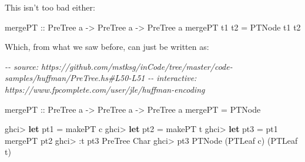 \documentclass[]{article}
\newenvironment{Shaded}{}{}
\newcommand{\CharTok}[1]{\textcolor[rgb]{0.25,0.44,0.63}{#1}}
\newcommand{\CommentTok}[1]{\textcolor[rgb]{0.38,0.63,0.69}{\textit{#1}}}
\newcommand{\DataTypeTok}[1]{\textcolor[rgb]{0.56,0.13,0.00}{#1}}
\newcommand{\KeywordTok}[1]{\textcolor[rgb]{0.00,0.44,0.13}{\textbf{#1}}}
\newcommand{\NormalTok}[1]{#1}
\newcommand{\OperatorTok}[1]{\textcolor[rgb]{0.40,0.40,0.40}{#1}}
\newcommand{\OtherTok}[1]{\textcolor[rgb]{0.00,0.44,0.13}{#1}}
\begin{document}
This isn't too bad either:

\begin{Shaded}
\begin{Highlighting}[]
\OtherTok{mergePT\textquotesingle{} ::} \DataTypeTok{PreTree}\NormalTok{ a }\OtherTok{{-}\textgreater{}} \DataTypeTok{PreTree}\NormalTok{ a }\OtherTok{{-}\textgreater{}} \DataTypeTok{PreTree}\NormalTok{ a}
\NormalTok{mergePT\textquotesingle{} t1 t2 }\OtherTok{=} \DataTypeTok{PTNode}\NormalTok{ t1 t2}
\end{Highlighting}
\end{Shaded}

Which, from what we saw before, can just be written as:

\begin{Shaded}
\begin{Highlighting}[]
\CommentTok{{-}{-} source: https://github.com/mstksg/inCode/tree/master/code{-}samples/huffman/PreTree.hs\#L50{-}L51}
\CommentTok{{-}{-} interactive: https://www.fpcomplete.com/user/jle/huffman{-}encoding}

\OtherTok{mergePT ::} \DataTypeTok{PreTree}\NormalTok{ a }\OtherTok{{-}\textgreater{}} \DataTypeTok{PreTree}\NormalTok{ a }\OtherTok{{-}\textgreater{}} \DataTypeTok{PreTree}\NormalTok{ a}
\NormalTok{mergePT }\OtherTok{=} \DataTypeTok{PTNode}
\end{Highlighting}
\end{Shaded}

\begin{Shaded}
\begin{Highlighting}[]
\NormalTok{ghci}\OperatorTok{\textgreater{}} \KeywordTok{let}\NormalTok{ pt1 }\OtherTok{=}\NormalTok{ makePT }\CharTok{\textquotesingle{}c\textquotesingle{}}
\NormalTok{ghci}\OperatorTok{\textgreater{}} \KeywordTok{let}\NormalTok{ pt2 }\OtherTok{=}\NormalTok{ makePT }\CharTok{\textquotesingle{}t\textquotesingle{}}
\NormalTok{ghci}\OperatorTok{\textgreater{}} \KeywordTok{let}\NormalTok{ pt3 }\OtherTok{=}\NormalTok{ pt1 }\OtherTok{\textasciigrave{}mergePT\textasciigrave{}}\NormalTok{ pt2}
\NormalTok{ghci}\OperatorTok{\textgreater{}} \OperatorTok{:}\NormalTok{t pt3}
\DataTypeTok{PreTree} \DataTypeTok{Char}
\NormalTok{ghci}\OperatorTok{\textgreater{}}\NormalTok{ pt3}
\DataTypeTok{PTNode}\NormalTok{ (}\DataTypeTok{PTLeaf} \CharTok{\textquotesingle{}c\textquotesingle{}}\NormalTok{) (}\DataTypeTok{PTLeaf} \CharTok{\textquotesingle{}t\textquotesingle{}}\NormalTok{)}
\end{Highlighting}
\end{Shaded}
\end{document}
